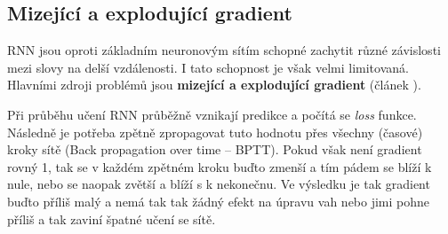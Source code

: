 


\subsection{Mizející a explodující gradient} \label{subsection:gradient}
RNN jsou oproti základním neuronovým sítím schopné zachytit různé závislosti mezi slovy na delší vzdálenosti. I tato schopnost je však velmi limitovaná. Hlavními zdroji problémů jsou \textbf{mizející a explodující gradient} (článek \cite{gradientProblems}). 


Při průběhu učení RNN průběžně vznikají predikce a počítá se \emph{loss}  funkce. Následně je potřeba zpětně zpropagovat tuto hodnotu přes všechny (časové) kroky sítě (Back propagation over time -- BPTT). Pokud však není gradient rovný 1, tak se v každém zpětném kroku buďto zmenší a tím pádem se blíží k nule, nebo se naopak zvětší a blíží s k nekonečnu. Ve výsledku je tak gradient buďto příliš malý a nemá tak tak žádný efekt na úpravu vah nebo jimi pohne příliš a tak zaviní špatné učení se sítě.

\begin{figure}
    \begin{center}
    \end{center}
	\caption{}
	\label{img:TODO}
\end{figure}

